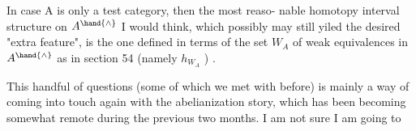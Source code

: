 In case A is only a test category,   then the most reaso-%
nable homotopy interval structure on $A^{\hand{\wedge}}$ I would think,  which possibly
may still yiled the desired "extra feature",  is the one defined in 
\margin{$\lfloor$}terms of the set $W_{A}$  of weak equivalences in $A^{\hand{\wedge}}$ as in section 54 (namely
$h_{W_{A}}$ ) .

\margin{$\lceil$}  This handful of questions (some of which we met with before) 
 is mainly a way of coming into touch again
with  the abelianization story,  which has been becoming somewhat
remote during the previous two months.  I am not sure I am going to


